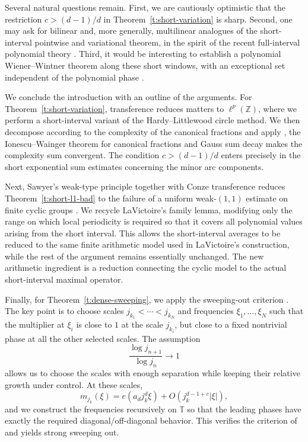 \documentclass[12pt,leqno]{amsart}
\newcounter{counter}
\newcounter{counter2}
\numberwithin{equation}{section}
\numberwithin{counter2}{section}
\newcounter{theorem}
\theoremstyle{definition}
\theoremstyle{plain}
\begin{document}
Several natural questions remain.  First, we are cautiously optimistic that the restriction
$c>(d-1)/d$ in Theorem~\ref{t:short-variation} is sharp.  Second, one may ask for bilinear and,
more generally, multilinear analogues of the short-interval pointwise and
variational theorem, in the spirit of the recent full-interval polynomial
theory \cite{KMT_pw_erg_bilinear_22,KMTT_bil_poly_prime_25,kosz2025multilinearcirclemethodquestion}.  Third, it would be
interesting to establish a polynomial Wiener--Wintner theorem along these short
windows, with an exceptional set independent of the polynomial phase \cite{Lesigne1993,Frantzikinakis2006}.

We conclude the introduction with an outline of the arguments.  For
Theorem~\ref{t:short-variation}, transference reduces matters to
$\ell^p(\mathbb Z)$, where we perform a short-interval variant of the
Hardy--Littlewood circle method. We then decompose according to
the complexity of the canonical fractions and apply
\cite[Theorem~5.2]{KMSZ26}, the Ionescu--Wainger theorem for canonical
fractions and Gauss sum decay makes the complexity sum convergent.  The condition
$c>(d-1)/d$ enters precisely in the short exponential sum estimates concerning the minor arc components.

Next, Sawyer's weak-type principle together with Conze transference reduces
Theorem~\ref{t:short-l1-bad} to
the failure of a uniform weak-$(1,1)$ estimate on finite cyclic groups
\cite{Sawyer1966,BM,L9}.  We recycle LaVictoire's family lemma, modifying only the range on which local periodicity is required so that it covers all polynomial values arising from the short interval. This allows the short-interval averages to be reduced to the same finite arithmetic model used in LaVictoire's construction, while the rest of the argument remains essentially unchanged. The new
arithmetic ingredient is a reduction connecting the cyclic model to the actual
short-interval maximal operator.  

Finally, for Theorem~\ref{t:dense-sweeping}, we apply the sweeping-out criterion \cite[Theorem~1.14]{SSOP_96}. The key point is to choose scales $j_{k_1}<\cdots<j_{k_N}$ and frequencies $\xi_1,\ldots,\xi_N$ such that the multiplier at $\xi_i$ is close to $1$ at the scale $j_{k_i}$, but close to a fixed nontrivial phase at all the other selected scales. The assumption
\[
\frac{\log j_{n+1}}{\log j_n}\to1
\]
allows us to choose the scales with enough separation while keeping their relative growth under control. At these scales,\[
m_{j_k}(\xi)
=e(a_dj_k^d\xi)
+O(j_k^{d-1+c}|\xi|),
\]
and we construct the frequencies recursively on $\mathbb T$ so that the leading phases have exactly the required diagonal/off-diagonal behavior. This verifies the criterion of \cite{SSOP_96} and yields strong sweeping out.
\end{document}
